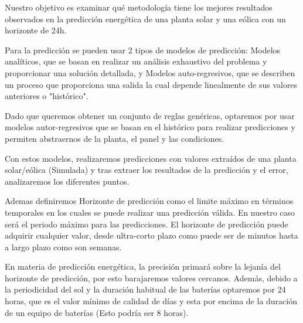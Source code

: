 Nuestro objetivo es examinar qué metodología tiene los mejores resultados observados en la predicción energética de una planta solar y una eólica con un horizonte de 24h.

Para la predicción se pueden usar 2 tipos de modelos de predicción: Modelos analíticos, que se basan en realizar un análisis exhaustivo del problema y proporcionar una solución detallada, y Modelos auto-regresivos, que se describen un proceso que proporciona una salida la cual depende linealmente de sus valores anteriores o "histórico".

Dado que queremos obtener un conjunto de reglas genéricas, optaremos por usar modelos autor-regresivos que se basan en el histórico para realizar predicciones y permiten abstraernos de la planta, el panel y las condiciones.

Con estos modelos, realizaremos predicciones con valores extraídos de una planta solar/eólica (Simulada) y tras extraer los resultados de la predicción y el error, analizaremos los diferentes puntos.

Ademas definiremos Horizonte de predicción como el limite máximo en términos temporales en los cuales se puede realizar una predicción válida. En nuestro caso será el periodo máximo para las predicciones.
El horizonte de predicción puede adquirir cualquier valor, desde ultra-corto plazo como puede ser de minutos hasta a largo plazo como son semanas.

En materia de predicción energética, la precisión primará sobre la lejanía del horizonte de predicción, por esto barajaremos valores cercanos. Además, debido a la periodicidad del sol y la duración habitual de las baterías optaremos por 24 horas, que es el valor mínimo de calidad de días y esta por encima de la duración de un equipo de baterías (Esto podría ser 8 horas).